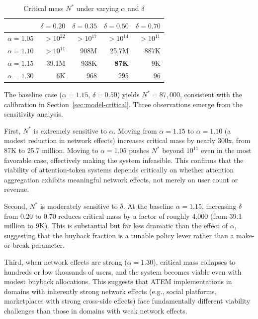 \documentclass[12pt, a4paper]{article}
\begin{document}
\begin{table}[H]
\centering
\caption{Critical mass $N^*$ under varying $\alpha$ and $\delta$}
\label{tab:sensitivity}
\begin{tabular}{lrrrr}
\toprule
 & $\delta = 0.20$ & $\delta = 0.35$ & $\delta = 0.50$ & $\delta = 0.70$ \\
\midrule
$\alpha = 1.05$ & $> 10^{22}$ & $> 10^{17}$ & $> 10^{14}$ & $> 10^{11}$ \\
$\alpha = 1.10$ & $> 10^{11}$ & 908M & 25.7M & 887K \\
$\alpha = 1.15$ & 39.1M & 938K & \textbf{87K} & 9K \\
$\alpha = 1.30$ & 6K & 968 & 295 & 96 \\
\bottomrule
\end{tabular}
\end{table}

The baseline case ($\alpha = 1.15$, $\delta = 0.50$) yields $N^* = 87{,}000$, consistent with the calibration in Section~\ref{sec:model-critical}. Three observations emerge from the sensitivity analysis.

First, $N^*$ is extremely sensitive to $\alpha$. Moving from $\alpha = 1.15$ to $\alpha = 1.10$ (a modest reduction in network effects) increases critical mass by nearly 300x, from 87K to 25.7 million. Moving to $\alpha = 1.05$ pushes $N^*$ beyond $10^{11}$ even in the most favorable case, effectively making the system infeasible. This confirms that the viability of attention-token systems depends critically on whether attention aggregation exhibits meaningful network effects, not merely on user count or revenue.

Second, $N^*$ is moderately sensitive to $\delta$. At the baseline $\alpha = 1.15$, increasing $\delta$ from 0.20 to 0.70 reduces critical mass by a factor of roughly 4,000 (from 39.1 million to 9K). This is substantial but far less dramatic than the effect of $\alpha$, suggesting that the buyback fraction is a tunable policy lever rather than a make-or-break parameter.

Third, when network effects are strong ($\alpha = 1.30$), critical mass collapses to hundreds or low thousands of users, and the system becomes viable even with modest buyback allocations. This suggests that ATEM implementations in domains with inherently strong network effects (e.g., social platforms, marketplaces with strong cross-side effects) face fundamentally different viability challenges than those in domains with weak network effects.
\end{document}
